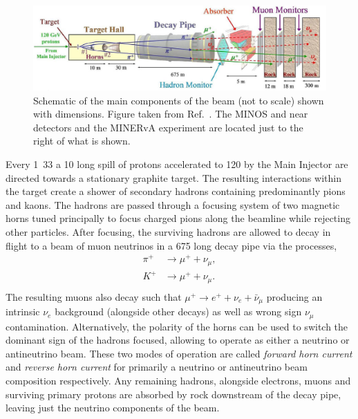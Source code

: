 \begin{figure} %
    \includegraphics[width=\textwidth]{diagrams/4-chips/numi_beam.png}
    \caption[Schematic of the main components of the \numi beam.]
    {Schematic of the main components of the \numi beam (not to scale) shown with dimensions.
        Figure taken from Ref.~\cite{adamson2016}. The MINOS and \nova near detectors and the
        MINERvA experiment are located just to the right of what is shown.}
    \label{fig:numi_beam}
\end{figure}

Every \unit{1.33}{} a \unit{10}{\mu{}} long spill of protons accelerated
to \unit{120}{\GeV} by the Main Injector are directed towards a stationary graphite target. The
resulting interactions within the target create a shower of secondary hadrons containing
predominantly pions and kaons. The hadrons are passed through a focusing system of two magnetic
horns tuned principally to focus charged pions along the beamline while rejecting other particles.
After focusing, the surviving hadrons are allowed to decay in flight to a beam of muon neutrinos
in a \unit{675}{} long decay pipe via the processes,
\begin{align} %
    \pi^{+} & \rightarrow\mu^{+}+\nu_{\mu}, \\
    K^{+}   & \rightarrow\mu^{+}+\nu_{\mu}. \\
    \label{eq:numi_decays}
\end{align}
The resulting muons also decay such that $\mu^{+}\rightarrow e^{+}+\nu_{e}+\bar{\nu}_{\mu}$
producing an intrinsic $\nu_{e}$ background (alongside other decays) as well as wrong sign
$\nu_{\mu}$ contamination. Alternatively, the polarity of the horns can be used to switch the
dominant sign of the hadrons focused, allowing \numi to operate as either a neutrino or
antineutrino beam. These two modes of operation are called \emph{forward horn current} and
\emph{reverse horn current} for primarily a neutrino or antineutrino beam composition
respectively. Any remaining hadrons, alongside electrons, muons and surviving primary protons are
absorbed by rock downstream of the decay pipe, leaving just the neutrino components of the beam.

